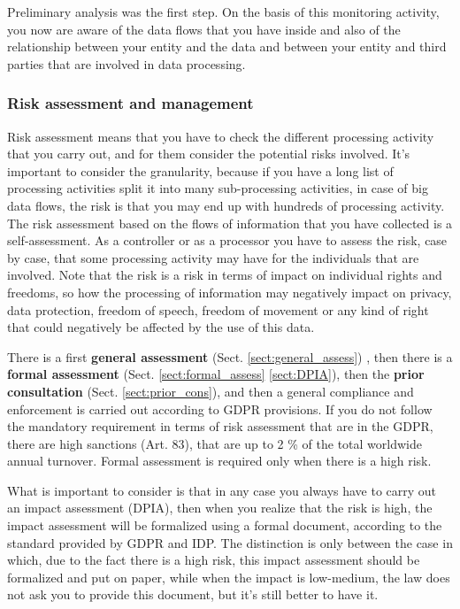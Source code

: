 Preliminary analysis was the first step. On the basis of this monitoring activity, you now are aware of the data flows that you have inside and also of the relationship between your entity and the data and between your entity and third parties that are involved in data processing.
\subsubsection{Risk assessment and management}
Risk assessment means that you have to check the different processing activity that you carry out, and for them consider the potential risks involved.
It's important to consider the granularity, because if you have a long list of processing activities split it into many sub-processing activities, in case of big data flows, the risk is that you may end up with hundreds of processing activity.
The risk assessment based on the flows of information that you have collected is a self-assessment. As a controller or as a processor you have to assess the risk, case by case, that some processing activity may have for the individuals that are involved. Note that the risk is a risk in terms of impact on individual rights and freedoms, so how the processing of information may negatively impact on privacy, data protection, freedom of speech, freedom of movement or any kind of right that could negatively be affected by the use of this data.

There is a first \textbf{general assessment} (Sect. \ref{sect:general_assess}) , then there is a \textbf{formal assessment} (Sect. \ref{sect:formal_assess} \ref{sect:DPIA}), then the \textbf{prior consultation} (Sect. \ref{sect:prior_cons}), and then a general compliance and enforcement is carried out according to GDPR provisions. If you do not follow the mandatory requirement in terms of risk assessment that are in the GDPR, there are high sanctions (Art. 83), that are up to 2 \% of the total worldwide annual turnover. Formal assessment is required only when there is a high risk.

What is important to consider is that in any case you always have to carry out an impact assessment (DPIA), then when you realize that the risk is high, the impact assessment will be formalized using a formal document, according to the standard provided by GDPR and IDP. The distinction is only between the case in which, due to the fact there is a high risk, this impact assessment should be formalized and put on paper, while when the impact is low-medium, the law does not ask you to provide this document, but it's still better to have it.

